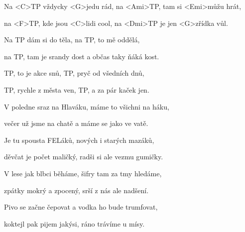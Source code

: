 

\zs
Na <C>TP vždycky <G>jedu rád,
na <Ami>TP, tam si <Emi>můžu hrát,

na <F>TP, kde jsou <C>lidi cool,
na <Dmi>TP je jen <G>zřídka vůl.
\ks

\zs
Na TP dám si do těla,
na TP, to mě oddělá,

na TP, tam je srandy dost
a občas taky ňáká kost.
\ks

\zr
TP, to je akce snů,
TP, pryč od všedních dnů,

TP, rychle z města ven,
TP, a za pár kaček jen.
\kr

\zs
V poledne sraz na Hlaváku,
máme to všichni na háku,

večer už jsme na chatě
a máme se jako ve vatě.
\ks

\zs
Je tu spousta FELáků,
nových i starých mazáků,

děvčat je počet maličký,
radši si ale vezmu gumičky.
\ks

\zr
\kr

\zs
V lese jak blbci běháme,
šifry tam za tmy hledáme,

zpátky mokrý a zpocený,
srší z nás ale nadšení.
\ks

\zs
Pivo se začne čepovat
a vodka ho bude trumfovat,

koktejl pak pijem jakýsi,
ráno trávíme u mísy.
\ks

\zr
\kr

\kp 
